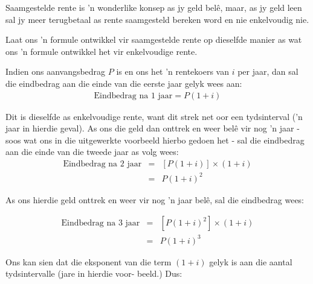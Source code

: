 Saamgestelde rente is 'n wonderlike konsep as jy geld bel\^e, maar, as jy geld leen sal jy meer terugbetaal as rente saamgesteld bereken word en nie enkelvoudig nie.




Laat ons ’n formule ontwikkel vir saamgestelde rente op dieselfde manier as wat ons ’n formule ontwikkel het vir
enkelvoudige rente.\par

Indien ons aanvangsbedrag $P$ is en ons het ’n rentekoers van $i$ per jaar, dan sal die eindbedrag aan die einde
van die eerste jaar gelyk wees aan:
\begin{eqnarray*}
    \text{Eindbedrag na 1 jaar} = P(1 + i)
\end{eqnarray*}

Dit is dieselfde as enkelvoudige rente, want dit strek net oor een tydsinterval (’n jaar in hierdie geval). As ons die
geld dan onttrek en weer belê vir nog ’n jaar - soos wat ons in die uitgewerkte voorbeeld hierbo gedoen het - sal
die eindbedrag aan die einde van die tweede jaar as volg wees:
\begin{eqnarray*}
    \text{Eindbedrag na 2 jaar} &=& [P(1 + i)] \times (1 + i)\\
    &=& P(1 + i)^2
\end{eqnarray*}

As ons hierdie geld onttrek en weer vir nog ’n jaar belê, sal die eindbedrag wees:

\begin{eqnarray*}
    \text{Eindbedrag na 3 jaar} &=& [P(1 + i)^2] \times (1 + i)\\
    &=& P(1 + i)^3
\end{eqnarray*}

Ons kan sien dat die eksponent van die term $(1 + i)$ gelyk is aan die aantal tydsintervalle (jare in hierdie voor-
beeld.) Dus:




